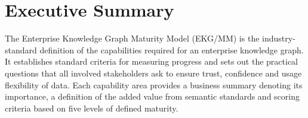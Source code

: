 \section{Executive Summary}

The Enterprise Knowledge Graph Maturity Model (EKG/MM) is the industry-standard definition of the capabilities required for an enterprise knowledge graph.  It establishes standard criteria for measuring progress and sets out the practical questions that all involved stakeholders ask to ensure trust, confidence and usage flexibility of data.  Each capability area provides a business summary denoting its importance, a definition of the added value from semantic standards and scoring criteria based on five levels of defined maturity. 
